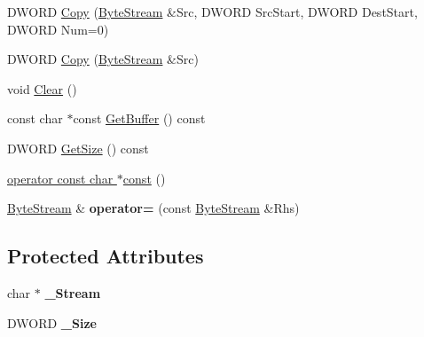 \begin{DoxyCompactItemize}
D\+W\+O\+RD \hyperlink{class_canberra_1_1_utility_1_1_core_1_1_byte_stream_ac9a7219af83b6276b547a45ae0d15aeb_ac9a7219af83b6276b547a45ae0d15aeb}{Copy} (\hyperlink{class_canberra_1_1_utility_1_1_core_1_1_byte_stream}{Byte\+Stream} \&Src, D\+W\+O\+RD Src\+Start, D\+W\+O\+RD Dest\+Start, D\+W\+O\+RD Num=0)
\item 
D\+W\+O\+RD \hyperlink{class_canberra_1_1_utility_1_1_core_1_1_byte_stream_a77b71d73dd8ca721e458728a8b684446_a77b71d73dd8ca721e458728a8b684446}{Copy} (\hyperlink{class_canberra_1_1_utility_1_1_core_1_1_byte_stream}{Byte\+Stream} \&Src)
\item 
void \hyperlink{class_canberra_1_1_utility_1_1_core_1_1_byte_stream_af771098ca049f3e53ddc7b2afaebc2dc_af771098ca049f3e53ddc7b2afaebc2dc}{Clear} ()
\item 
const char $\ast$const \hyperlink{class_canberra_1_1_utility_1_1_core_1_1_byte_stream_a8e29355fc0049cc2a715c0dd4da71903_a8e29355fc0049cc2a715c0dd4da71903}{Get\+Buffer} () const
\item 
D\+W\+O\+RD \hyperlink{class_canberra_1_1_utility_1_1_core_1_1_byte_stream_a268d73a8a3a65864800e08c7a081a58d_a268d73a8a3a65864800e08c7a081a58d}{Get\+Size} () const
\item 
\hyperlink{class_canberra_1_1_utility_1_1_core_1_1_byte_stream_a5008a7438dc03640ce29323460d7d3b0_a5008a7438dc03640ce29323460d7d3b0}{operator const char $\ast$const} ()
\item 
\mbox{\label{class_canberra_1_1_utility_1_1_core_1_1_byte_stream_aed61da0d13e832e66888233bb38d01c6}} 
\hyperlink{class_canberra_1_1_utility_1_1_core_1_1_byte_stream}{Byte\+Stream} \& {\bfseries operator=} (const \hyperlink{class_canberra_1_1_utility_1_1_core_1_1_byte_stream}{Byte\+Stream} \&Rhs)
\end{DoxyCompactItemize}
\subsection*{Protected Attributes}
\begin{DoxyCompactItemize}
\item 
\mbox{\label{class_canberra_1_1_utility_1_1_core_1_1_byte_stream_a42aaf47200f496cc5db245a78acc2e9e}} 
char $\ast$ {\bfseries \+\_\+\+Stream}
\item 
\mbox{\label{class_canberra_1_1_utility_1_1_core_1_1_byte_stream_a5995f40754285a93c13ddc4f11897615}} 
D\+W\+O\+RD {\bfseries \+\_\+\+Size}
\end{DoxyCompactItemize}


